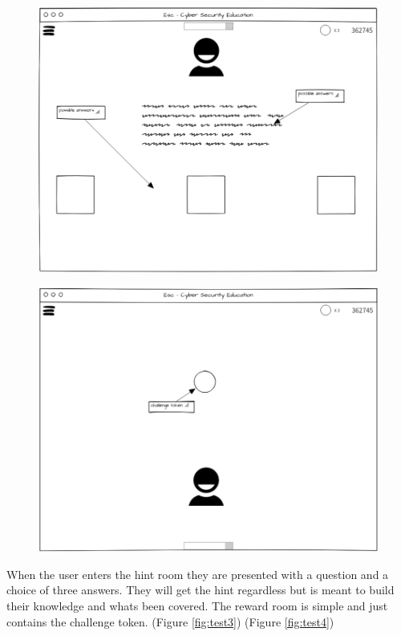 \documentclass[12pt,a4paper]{article}
\begin{document}
\begin{figure}
\centering
\begin{minipage}{.5\textwidth}
  \centering
  \includegraphics[width=1\linewidth]{Figs/Ui_hint_room.PNG}
  \label{fig:test1}
\end{minipage}%
\begin{minipage}{.5\textwidth}
  \centering
  \includegraphics[width=1\linewidth]{Figs/Ui_reward_room.PNG}
  \label{fig:test2}
\end{minipage}
\end{figure}   

When the user enters the hint room they are presented with a question and a choice of three answers. They will get the hint regardless but is meant to build their knowledge and whats been covered. The reward room is simple and just contains the challenge token. (Figure \ref{fig:test3}) (Figure \ref{fig:test4})
\end{document}
